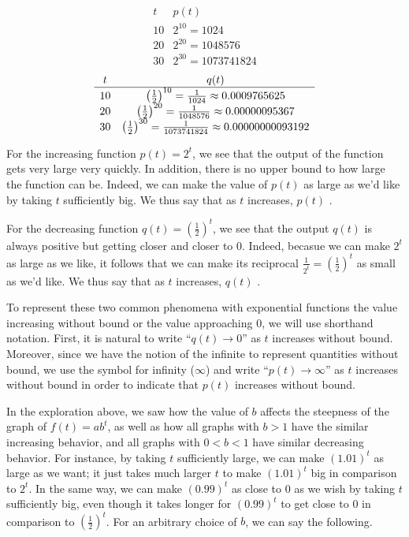 \documentclass[nooutcomes]{ximera}
\begin{document}
$$
{\begin{array}{cc}
t&p(t)\\
\hline
10&2^{10}=1024\\
20&2^{20}=1048576\\
30&2^{30}=1073741824
\end{array}}%
$$
$$
{\begin{array}{cc}
t&q(t)\\
\hline
10&\left(\frac{1}{2}\right)^{10}=\frac{1}{1024} \approx 0.0009765625\\
20&\left(\frac{1}{2}\right)^{20}=\frac{1}{1048576} \approx 0.00000095367\\
30&\left(\frac{1}{2}\right)^{30}=\frac{1}{1073741824} \approx 0.00000000093192
\end{array}}\\
$$

For the increasing function $p(t) = 2^t$, we see that the output of the function gets very large very quickly.  In addition, there is no upper bound to how large the function can be.  Indeed, we can make the value of $p(t)$ as large as we'd like by taking $t$ sufficiently big.  We thus say that as $t$ increases, $p(t)$ .

For the decreasing function $q(t) =\left(\frac{1}{2}\right)^t$, we see that the output $q(t)$ is always positive but getting closer and closer to $0$.  Indeed, becasue we can make $2^t$ as large as we like, it follows that we can make its reciprocal $\frac{1}{2^t} =\left(\frac{1}{2}\right)^t$ as small as we'd like.  We thus say that as $t$ increases, $q(t)$ . 

To represent these two common phenomena with exponential functions the value increasing without bound or the value approaching $0$, we will use shorthand notation.  First, it is natural to write ``$q(t) \to 0$'' as $t$ increases without bound.  Moreover, since we have the notion of the infinite to represent quantities without bound, we use the symbol for infinity  ($\infty$) and write ``$p(t) \to \infty$'' as $t$ increases without bound in order to indicate that $p(t)$ increases without bound.

In the exploration above, we saw how the value of $b$ affects the steepness of the graph of $f(t) = ab^t$, as well as how all graphs with $b > 1$ have the similar increasing behavior, and all graphs with $0 < b < 1$ have similar decreasing behavior.  For instance, by taking $t$ sufficiently large, we can make $(1.01)^t$ as large as we want; it just takes much larger $t$ to make $(1.01)^t$ big in comparison to $2^t$.  In the same way, we can make $(0.99)^t$ as close to $0$ as we wish by taking $t$ sufficiently big, even though it takes longer for $(0.99)^t$ to get close to $0$ in comparison to $\left(\frac{1}{2}\right)^t$.  For an arbitrary choice of $b$, we can say the following.
\end{document}
